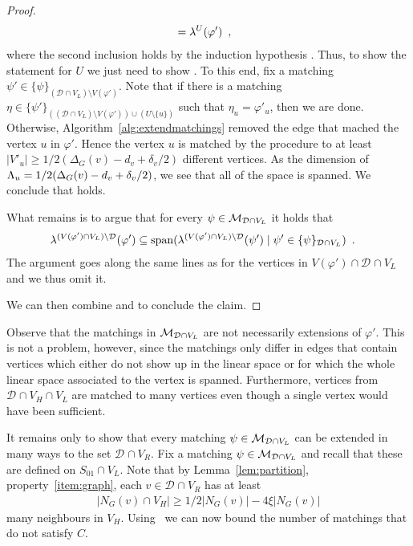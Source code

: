 \documentclass{article}
\newcommand{\set}[1]{\{ #1 \}}
\newcommand{\Setsize}[1]{\bigl\lvert#1\bigr\rvert}
\newcommand{\setsize}[1]{\lvert#1\rvert}
\newcommand{\eqperiod}{\enspace .}
\newcommand{\eqcomma}{\enspace ,}
\newcommand{\neigh}[2][]{N_{{#1}}(#2)}
\renewcommand{\deg}[2][XXXXXXXXXXXX]{\Delta_{#1}(#2)}
\newcommand{\diff}{\xi}
\newcommand{\ontodimLi}{1/2(\deg[G]{v} - d_v + \delta_v/2)}
\newcommand{\V}[1][]{V_{#1}}
\newcommand{\Vl}{\V[L]}
\newcommand{\Vr}{\V[R]}
\newcommand{\Vh}{\V[H]}
\newcommand{\linspace}[1][]{\ensuremath \Lambda_{{#1}}}
\newcommand{\linmapl}[2][]{\ensuremath \lambda^{{#2}}_{{#1}}}
\newcommand{\linmaplof}[3][]{\linmapl[#1]{#2}(#3)}
\newcommand{\diffclosure}[1][]{D_{{#1}}}
\renewcommand{\diffclosure}[1][]{\mathcal{D}_{{#1}}}
\newcommand{\matchb}{\varphi'}
\newcommand{\matchc}{\psi}
\newcommand{\matchd}{\psi'}
\newcommand{\matche}{\eta}
\newcommand{\matchings}[1][]{\ensuremath \mathcal{M}_{{#1}}}
\newcommand{\spans}[1]{\mathrm{span} ( #1 )}
\numberwithin{equation}{section}
\begin{document}
\begin{proof}
\begin{align}
    &= \linmaplof{U}{\matchb} \eqcomma
  \end{align}
  where the second inclusion holds by the induction hypothesis
  . 
  Thus, to show the statement for $U$ we just need to show 
  .
  To this end, fix a matching 
  ${\matchd \in \set{\matchc}_{(\diffclosure \cap \Vl) \setminus V(\matchb)}}$.
  Note that if there is a matching
  $\matche \in \set{\matchd}_{((\diffclosure \cap \Vl) \setminus
    V(\matchb)) \cup (U \setminus \set{u})}$ 
  such that $\matche_u = \matchb_u$, then we are done.
  Otherwise, Algorithm~\ref{alg:extendmatchings} removed the edge
  that mached the vertex $u$ in $\matchb$. Hence the vertex $u$ is
  matched by the procedure to at least $\setsize{V'_{u}} \ge \ontodimLi$
  different vertices. As the dimension of $\linspace[u] = \ontodimLi$,
  we see that all of the space is spanned. We conclude that
   holds.

  What remains is to argue that for every $\matchc \in
  \matchings[\diffclosure \cap \Vl]$ it holds that
  \begin{align}\label{eq:not_d}
    \linmaplof{(V(\matchb) \cap \Vl) \setminus \diffclosure}{\matchb}
    &\subseteq
      \spans{\linmaplof{(V(\matchb) \cap \Vl) \setminus \diffclosure}
      {\matchd} \mid \matchd \in
      \set{\matchc}_{\diffclosure \cap \Vl}} \eqperiod
  \end{align}
  The argument goes along the same lines as for the vertices in 
  $V(\matchb) \cap \diffclosure \cap \Vl$ and we thus omit it.

  We can then combine  and  to conclude
  the claim.
\end{proof}

   
  Observe that the matchings in $\matchings[\diffclosure \cap \Vl]$ are
  not necessarily extensions of $\matchb$. This is not a problem, however,
  since the matchings only
  differ in edges that contain vertices which either do not show up in the linear space or
  for which the whole linear space associated to the vertex is spanned. Furthermore, vertices from $\diffclosure \cap \Vh \cap \Vl$ are matched to
  many vertices
  even though a single vertex would have been sufficient.

  It remains only to show that every matching
  $\matchc \in \matchings[\diffclosure \cap \Vl]$ can be extended in
  many ways to the set $\diffclosure \cap \Vr$.
  Fix a matching 
  $\matchc \in \matchings[\diffclosure \cap \Vl]$ and recall
  that these are defined on $S_{01} \cap \Vl$.
  Note that by Lemma~\ref{lem:partition}, property~\ref{item:graph},
  each $v \in \diffclosure \cap \Vr$ has at least
  \begin{equation}
  \begin{aligned}
  	\Setsize{\neigh[G]{v} \cap \Vh} \ge 
  	1/2 \Setsize{ \neigh[G]{v} } - 4 \diff \Setsize{ \neigh[G]{v} } 
  	\label{eq:largeneighbourhood}
  \end{aligned}
  \end{equation}
  many neighbours in $\Vh$.
  Using~ we can now bound the number of matchings that do not 
  satisfy $C$.
\end{document}
